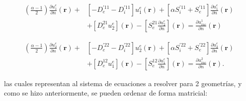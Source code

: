 \documentclass[12pt,letterpaper]{report}
\numberwithin{equation}{section}
\begin{document}
\begin{equation}
\begin{split}
(\frac{\alpha - 1}{2})\frac{\partial u^{e}_1}{\partial n}(\textbf{r}) + &\left[-D_{e}^{'11} - D_{i}^{'11}\right] u^{e}_1(\textbf{r}) + \left[\alpha S_{i}^{'11} + S_{e}^{'11}\right]\frac{\partial u^{e}_1}{\partial n}(\textbf{r})\\
&+ \left[D_{e}^{21} u^{e}_2\right](\textbf{r}) - \left[S_{e}^{21} \frac{\partial u^{e}_2}{\partial n}\right](\textbf{r}) = \frac{\partial u_{inc}^1}{\partial n}(\textbf{r}) 
\end{split}
\label{eq: multi_trans_deriv_1}		
\end{equation}

\begin{equation}
\begin{split}
(\frac{\alpha - 1}{2})\frac{\partial u^{e}_2}{\partial n}(\textbf{r}) + &\left[-D_{e}^{'22} - D_{i}^{'22}\right] u^{e}_2(\textbf{r}) + \left[\alpha S_{i}^{'22} + S_{e}^{'22}\right]\frac{\partial u^{e}_2}{\partial n}(\textbf{r})\\
&+ \left[D_{e}^{12} u^{e}_1\right](\textbf{r}) - \left[S_{e}^{12} \frac{\partial u^{e}_1}{\partial n}\right](\textbf{r}) = \frac{\partial u_{inc}^2}{\partial n}(\textbf{r}). 
\end{split}
\label{eq: multi_trans_deriv_2}		
\end{equation}

\noindent las cuales representan al sistema de ecuaciones a resolver para 2 geometrías, y como se hizo anteriormente, se pueden ordenar de forma matricial:
\end{document}
